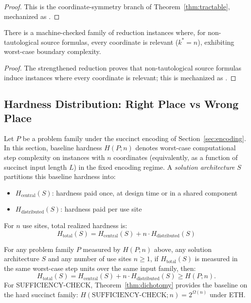 \begin{proof}
This is the coordinate-symmetry branch of Theorem~\ref{thm:tractable}, mechanized as .
\end{proof}

\begin{corollary}\label{cor:practice-unstructured}
There is a machine-checked family of reduction instances where, for non-tautological source formulas, every coordinate is relevant ($k^*=n$), exhibiting worst-case boundary complexity.
\end{corollary}

\begin{proof}
The strengthened reduction proves that non-tautological source formulas induce instances where every coordinate is relevant; this is mechanized as .
\end{proof}

\subsection{Hardness Distribution: Right Place vs Wrong Place}\label{sec:hardness-distribution}

\begin{definition}\label{def:hardness-distribution}
Let $P$ be a problem family under the succinct encoding of Section~\ref{sec:encoding}. In this section, baseline hardness $H(P;n)$ denotes worst-case computational step complexity on instances with $n$ coordinates (equivalently, as a function of succinct input length $L$) in the fixed encoding regime. A \emph{solution architecture} $S$ partitions this baseline hardness into:
\begin{itemize}
\item $H_{\text{central}}(S)$: hardness paid once, at design time or in a shared component
\item $H_{\text{distributed}}(S)$: hardness paid per use site
\end{itemize}
For $n$ use sites, total realized hardness is:
\[H_{\text{total}}(S) = H_{\text{central}}(S) + n \cdot H_{\text{distributed}}(S)\]
\end{definition}

\begin{proposition}\label{prop:hardness-conservation}
For any problem family $P$ measured by $H(P;n)$ above, any solution architecture $S$ and any number of use sites $n \ge 1$, if $H_{\text{total}}(S)$ is measured in the same worst-case step units over the same input family, then:
\[
H_{\text{total}}(S) = H_{\text{central}}(S) + n \cdot H_{\text{distributed}}(S) \geq H(P;n).
\]
For SUFFICIENCY-CHECK, Theorem~\ref{thm:dichotomy} provides the baseline on the hard succinct family: $H(\text{SUFFICIENCY-CHECK};n)=2^{\Omega(n)}$ under ETH.
\end{proposition}

